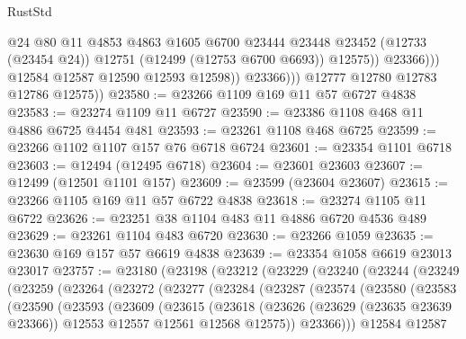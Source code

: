 \begin{lexlean}{RustStd}
\begin{coremodule}
{\begin{coremodule}
{{{{{{{{{{{{{{{{{{{{{{{{{{{{{{{{{{{{{{{{{{{{{{{{{{{{{{{{{{{{{{{{{{{{{{{{{{{{{{{{                            @24
                            @80
                            @11
                            @4853
                            @4863
                            @1605
                            @6700
                            @23444
                            @23448
                            @23452
                            (@12733 (@23454 @24))
                            @12751
                            (@12499 (@12753 @6700 @6693))
                            @12575))
                        @23366)))
                  @12584
                  @12587
                  @12590
                  @12593
                  @12598))
              @23366)))
        @12777
        @12780
        @12783
        @12786
        @12575))
@23580 := @23266 @1109 @169 @11 @57 @6727 @4838
@23583 := @23274 @1109 @11 @6727
@23590 := @23386 @1108 @468 @11 @4886 @6725 @4454 @481
@23593 := @23261 @1108 @468 @6725
@23599 := @23266 @1102 @1107 @157 @76 @6718 @6724
@23601 := @23354 @1101 @6718
@23603 := @12494 (@12495 @6718)
@23604 := @23601 @23603
@23607 := @12499 (@12501 @1101 @157)
@23609 := @23599 (@23604 @23607)
@23615 := @23266 @1105 @169 @11 @57 @6722 @4838
@23618 := @23274 @1105 @11 @6722
@23626 := @23251 @38 @1104 @483 @11 @4886 @6720 @4536 @489
@23629 := @23261 @1104 @483 @6720
@23630 := @23266 @1059
@23635 := @23630 @169 @157 @57 @6619 @4838
@23639 := @23354 @1058 @6619 @23013 @23017
@23757 := @23180
    (@23198
      (@23212
        (@23229
          (@23240
            (@23244
              (@23249
                (@23259
                  (@23264
                    (@23272
                      (@23277
                        (@23284
                          (@23287
                            (@23574
                              (@23580
                                (@23583
                                  (@23590
                                    (@23593
                                      (@23609
                                        (@23615
                                          (@23618
                                            (@23626
                                              (@23629 (@23635 @23639 @23366))
                                              @12553
                                              @12557
                                              @12561
                                              @12568
                                              @12575))
                                          @23366)))
                                    @12584
                                    @12587
}}}}}}}}}}}}}}}}}}}}}}}}}}}}}}}}}}}}}}}}}}}}}}}}}}}}}}}}}}}}}}}}}}}}}}}}}}}}}}}}
\end{coremodule}}
\end{coremodule}
\end{lexlean}
